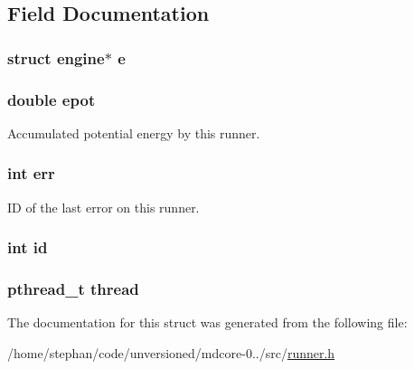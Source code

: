 \subsection{Field Documentation}
\hypertarget{structrunner_a9bbd1f231e51d1c76b353c3eec2169e1}{
\subsubsection[{e}]{\setlength{\rightskip}{0pt plus 5cm}struct {\bf engine}$\ast$ e}}\label{structrunner_a9bbd1f231e51d1c76b353c3eec2169e1}
\hypertarget{structrunner_a3e050eccabbd5322482d7f63e45f038d}{
\subsubsection[{epot}]{\setlength{\rightskip}{0pt plus 5cm}double epot}}\label{structrunner_a3e050eccabbd5322482d7f63e45f038d}
Accumulated potential energy by this runner. \hypertarget{structrunner_a6ce68847c12434f60d1b2654a3dc3409}{
\subsubsection[{err}]{\setlength{\rightskip}{0pt plus 5cm}int err}}\label{structrunner_a6ce68847c12434f60d1b2654a3dc3409}
I\-D of the last error on this runner. \hypertarget{structrunner_a7441ef0865bcb3db9b8064dd7375c1ea}{
\subsubsection[{id}]{\setlength{\rightskip}{0pt plus 5cm}int id}}\label{structrunner_a7441ef0865bcb3db9b8064dd7375c1ea}
\hypertarget{structrunner_a01f75a9ad916f63a94e06a27635ba278}{
\subsubsection[{thread}]{\setlength{\rightskip}{0pt plus 5cm}pthread\-\_\-t thread}}\label{structrunner_a01f75a9ad916f63a94e06a27635ba278}


The documentation for this struct was generated from the following file\-:\begin{DoxyCompactItemize}
\item 
/home/stephan/code/unversioned/mdcore-\/0../src/\hyperlink{runner_8h}{runner.\-h}\end{DoxyCompactItemize}
